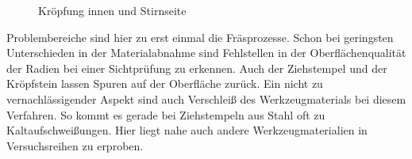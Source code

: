 \documentclass[12pt,a4paper,parskip]{scrartcl}
\begin{document}
{\begin{figure}[!htb]
\centering
\hfill
{}
\hspace{2.4cm}
\hfill
\caption{Kröpfung innen und Stirnseite }
\label{fig:kropfinstirn}
\end{figure}


 
Problembereiche sind hier zu erst einmal die Fräsprozesse. Schon bei geringsten Unterschieden in der Materialabnahme sind Fehlstellen in der Oberflächenqualität der Radien bei einer Sichtprüfung zu erkennen. Auch der Ziehstempel und der Kröpfstein lassen Spuren auf der Oberfläche zurück. Ein nicht zu vernachlässigender Aspekt sind auch Verschleiß des Werkzeugmaterials bei diesem Verfahren. So kommt es gerade bei Ziehstempeln aus Stahl oft zu Kaltaufschweißungen. Hier liegt nahe auch andere Werkzeugmaterialien in Versuchsreihen zu erproben.
\medskip

}
\end{document}
